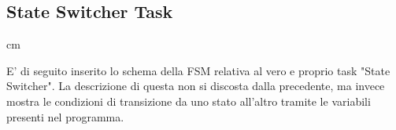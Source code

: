 \documentclass{article}
\begin{document}
\subsection{State Switcher Task}
 cm
\begin{center}
\end{center}
E' di seguito inserito lo schema della FSM relativa al vero e proprio task "State Switcher". La descrizione di questa non si discosta dalla precedente, ma invece mostra le condizioni di transizione da uno stato all'altro tramite le variabili presenti nel programma.
\end{document}
